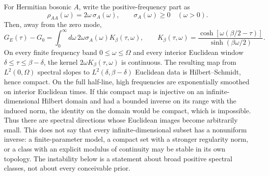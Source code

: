 For Hermitian bosonic \(A\), write the positive-frequency part as
\[
  \rho_{AA}(\omega)=2\omega\,\sigma_A(\omega),
  \qquad
  \sigma_A(\omega)\ge0
  \quad(\omega>0).
\]
Then, away from the zero mode,
\begin{equation}
  G_E(\tau)-G_0
  =
  \int_0^\infty d\omega\,
  2\omega\sigma_A(\omega)
  K_\beta(\tau,\omega),
  \qquad
  K_\beta(\tau,\omega)
  =
  \frac{\cosh[\omega(\beta/2-\tau)]}{\sinh(\beta\omega/2)} .
  \label{eq:thermal-positive-frequency-kernel}
\end{equation}
On every finite frequency band \(0\le\omega\le\Omega\) and every interior
Euclidean window \(\delta\le\tau\le\beta-\delta\), the kernel
\(2\omega K_\beta(\tau,\omega)\) is continuous.  The resulting map from
\(L^2(0,\Omega)\) spectral slopes to \(L^2(\delta,\beta-\delta)\) Euclidean
data is Hilbert--Schmidt, hence compact.  On the full half-line, high
frequencies are exponentially smoothed on interior Euclidean times.  If this
compact map is injective on an infinite-dimensional Hilbert domain and had a
bounded inverse on its range with the induced norm, the identity on the
domain would be compact, which is impossible.  Thus there are spectral
directions whose Euclidean images become arbitrarily small.  This does not
say that every infinite-dimensional subset has a nonuniform inverse: a
finite-parameter model, a compact set with a stronger regularity norm, or a
class with an explicit modulus of continuity may be stable in its own
topology.  The instability below is a statement about broad positive
spectral classes, not about every conceivable prior.

